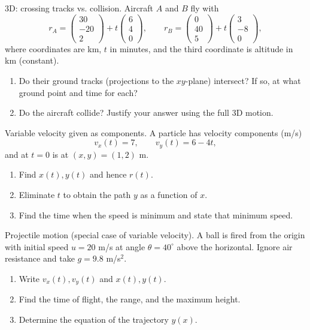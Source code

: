 \documentclass[11pt]{article}
\def\textbf#1{#1}%
\def\mathbf#1{#1}%
\newcounter{question}
\begin{document}
\begin{question}
\textbf{3D: crossing tracks vs. collision.}
Aircraft \(A\) and \(B\) fly with
\[
\mathbf{r}_A=\begin{pmatrix}30\\-20\\2\end{pmatrix}+t\begin{pmatrix}6\\4\\0\end{pmatrix},\qquad
\mathbf{r}_B=\begin{pmatrix}0\\40\\5\end{pmatrix}+t\begin{pmatrix}3\\-8\\0\end{pmatrix},
\]
where coordinates are km, \(t\) in minutes, and the third coordinate is altitude in km (constant).
\begin{enumerate}
  \item Do their ground tracks (projections to the \(xy\)-plane) intersect? If so, at what ground point and time for each?
  \item Do the aircraft collide? Justify your answer using the full 3D motion.
\end{enumerate}
\end{question}

\begin{question}
\textbf{Variable velocity given as components.}
A particle has velocity components (m/s)
\[
v_x(t)=7,\qquad v_y(t)=6-4t,
\]
and at \(t=0\) is at \((x,y)=(1,2)\) m.
\begin{enumerate}
  \item Find \(x(t),y(t)\) and hence \(\mathbf{r}(t)\).
  \item Eliminate \(t\) to obtain the path \(y\) as a function of \(x\).
  \item Find the time when the speed is minimum and state that minimum speed.
\end{enumerate}
\end{question}

\begin{question}
\textbf{Projectile motion (special case of variable velocity).}
A ball is fired from the origin with initial speed \(u=20\) m/s at angle \(\theta=40^\circ\) above the horizontal. Ignore air resistance and take \(g=9.8\) m/s\(^2\).
\begin{enumerate}
  \item Write \(v_x(t),v_y(t)\) and \(x(t),y(t)\).
  \item Find the time of flight, the range, and the maximum height.
  \item Determine the equation of the trajectory \(y(x)\).
\end{enumerate}
\end{question}
\end{document}
